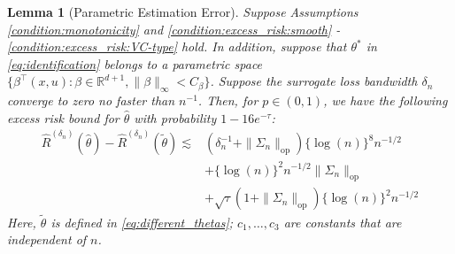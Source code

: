 \documentclass[12pt]{article}
\newtheorem{lemma}{Lemma}%
\newcommand{\R}{\mathbb{R}}
\begin{document}
\begin{lemma}[Parametric Estimation Error]\label{lemma:parametric_estimation_error}
Suppose Assumptions \ref{condition:monotonicity} and \ref{condition:excess_risk:smooth} - \ref{condition:excess_risk:VC-type} hold. In addition, suppose that $\theta^*$ in \eqref{eq:identification} belongs to a parametric space $\{\beta^\top(x,u):\beta\in \R^{d+1},\|\beta\|_{\infty}<C_\beta\}$. Suppose the surrogate loss bandwidth $\delta_n$ converge to zero no faster than $n^{-1}$. Then, for $p\in(0,1)$, we have the following excess risk bound for $\widehat\theta$ with probability $1-16e^{-\tau}$:
\begin{align*}
\widehat{R}^{(\delta_n)}(\widehat{\theta}) - \widehat{R}^{(\delta_n)}(\tilde{\theta}) \lesssim & \left(\delta_n^{-1}+\|\Sigma_n\|_{\mathrm{op}}\right) \{\log(n)\}^{8} n^{-1/2} \\
& + \{\log(n)\}^2 n^{-1/2}\|\Sigma_n\|_{\mathrm{op}} \\
& + \sqrt{\tau} \left(1+\|\Sigma_n\|_{\mathrm{op}}\right)\{\log(n)\}^2 n^{-1/2}
\end{align*}
Here, $\tilde\theta$ is defined in \eqref{eq:different_thetas}; $c_1,\ldots,c_3$ are constants that are independent of $n$.    
\end{lemma}
\end{document}
